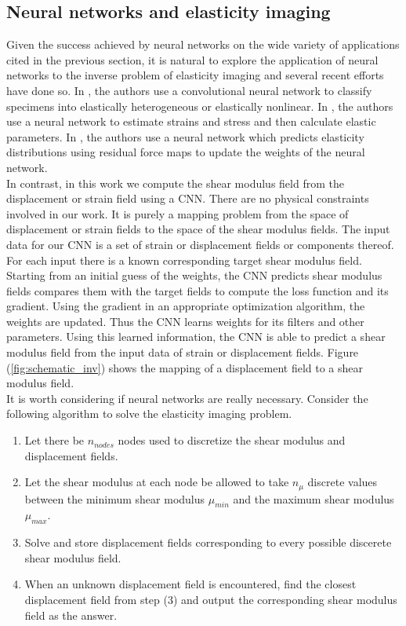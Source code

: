 \documentclass[12pt]{article}
\begin{document}
\subsection{Neural networks and elasticity imaging}
Given the success achieved by neural networks on the wide variety of applications cited in the previous section, it is natural to explore the application of neural networks to the inverse problem of elasticity imaging and several recent efforts \cite{paper:pateloberai2019,misc:gu2020,paper:hoeriginsana2016} have done so. In \cite{paper:pateloberai2019}, the authors use a convolutional neural network to classify specimens into elastically heterogeneous or elastically nonlinear. In \cite{paper:hoeriginsana2016}, the authors use a neural network to estimate strains and stress and then calculate elastic parameters. In \cite{misc:gu2020}, the authors use a neural network which predicts elasticity distributions using residual force maps to update the weights of the neural network. \\In contrast, in this work we compute the shear modulus field from the displacement or strain field using a CNN. There are no physical constraints involved in our work. It is purely a mapping problem from the space of displacement or strain fields to the space of the shear modulus fields. The input data for our CNN is a set of strain or displacement fields or components thereof. For each input there is a known corresponding target shear modulus field. Starting from an initial guess of the weights, the CNN predicts shear modulus fields compares them with the target fields to compute the loss function and its gradient. Using the gradient in an appropriate optimization algorithm, the weights are updated. Thus the CNN learns weights for its filters and other parameters. Using this learned information, the CNN is able to predict a shear modulus field from the input data of strain or displacement fields. Figure (\ref{fig:schematic_inv}) shows the mapping of a displacement field to a shear modulus field.\\
It is worth considering if neural networks are really necessary. Consider the following algorithm to solve the elasticity imaging problem.
%
\begin{enumerate}
\item{Let there be $n_{nodes}$ nodes used to discretize the shear modulus and displacement fields.}
\item{Let the shear modulus at each node be allowed to take $n_{\mu}$ discrete values between the minimum shear modulus $\mu_{min}$ and the maximum shear modulus $\mu_{max}$.}
\item{Solve and store displacement fields corresponding to every possible discerete shear modulus field.}
\item{When an unknown displacement field is encountered, find the closest displacement field from step (3) and output the corresponding shear modulus field as the answer.}
\end{enumerate}
\end{document}
